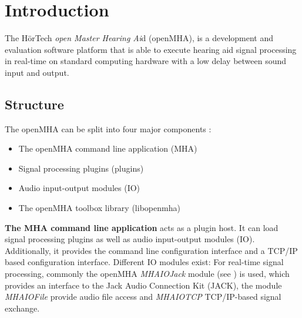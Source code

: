 
\section{Introduction}
The H\"{o}rTech \emph{open Master Hearing Ai}d (openMHA), is a development and evaluation software platform that is able to execute hearing aid signal processing in real-\/time on standard computing hardware with a low delay between sound input and output.

\subsection{Structure}\label{index_str}
The openMHA can be split into four major components :
\begin{itemize}
\item The openMHA command line application (MHA)
\item Signal processing plugins (plugins)
\item Audio input-\/output modules (IO)
\item The openMHA toolbox library (libopenmha)
\end{itemize} 

{\bf The MHA command line application} acts as a plugin host. It can load signal processing plugins as well as audio input-\/output modules (IO). Additionally, it provides the command line configuration interface and a TCP/IP based configuration interface. Different IO modules exist: For real-\/time signal processing, commonly the openMHA \emph{MHAIOJack} module (see \PluginManual) is used, which provides an interface to the Jack Audio Connection Kit (JACK), the module \emph{MHAIOFile} provide audio file access and \emph{MHAIOTCP} TCP/IP-\/based signal exchange.


